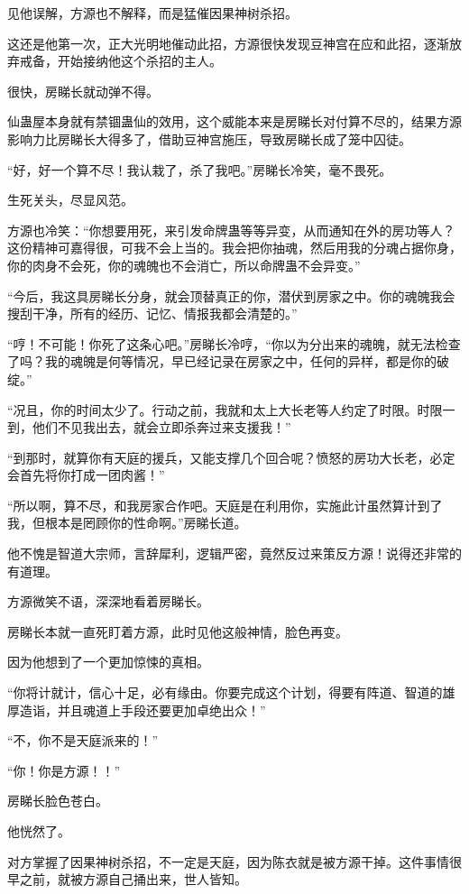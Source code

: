 \begin{this_body}
见他误解，方源也不解释，而是猛催因果神树杀招。

这还是他第一次，正大光明地催动此招，方源很快发现豆神宫在应和此招，逐渐放弃戒备，开始接纳他这个杀招的主人。

很快，房睇长就动弹不得。

仙蛊屋本身就有禁锢蛊仙的效用，这个威能本来是房睇长对付算不尽的，结果方源影响力比房睇长大得多了，借助豆神宫施压，导致房睇长成了笼中囚徒。

“好，好一个算不尽！我认栽了，杀了我吧。”房睇长冷笑，毫不畏死。

生死关头，尽显风范。

方源也冷笑：“你想要用死，来引发命牌蛊等等异变，从而通知在外的房功等人？这份精神可嘉得很，可我不会上当的。我会把你抽魂，然后用我的分魂占据你身，你的肉身不会死，你的魂魄也不会消亡，所以命牌蛊不会异变。”

“今后，我这具房睇长分身，就会顶替真正的你，潜伏到房家之中。你的魂魄我会搜刮干净，所有的经历、记忆、情报我都会清楚的。”

“哼！不可能！你死了这条心吧。”房睇长冷哼，“你以为分出来的魂魄，就无法检查了吗？我的魂魄是何等情况，早已经记录在房家之中，任何的异样，都是你的破绽。”

“况且，你的时间太少了。行动之前，我就和太上大长老等人约定了时限。时限一到，他们不见我出去，就会立即杀奔过来支援我！”

“到那时，就算你有天庭的援兵，又能支撑几个回合呢？愤怒的房功大长老，必定会首先将你打成一团肉酱！”

“所以啊，算不尽，和我房家合作吧。天庭是在利用你，实施此计虽然算计到了我，但根本是罔顾你的性命啊。”房睇长道。

他不愧是智道大宗师，言辞犀利，逻辑严密，竟然反过来策反方源！说得还非常的有道理。

方源微笑不语，深深地看着房睇长。

房睇长本就一直死盯着方源，此时见他这般神情，脸色再变。

因为他想到了一个更加惊悚的真相。

“你将计就计，信心十足，必有缘由。你要完成这个计划，得要有阵道、智道的雄厚造诣，并且魂道上手段还要更加卓绝出众！”

“不，你不是天庭派来的！”

“你！你是方源！！”

房睇长脸色苍白。

他恍然了。

对方掌握了因果神树杀招，不一定是天庭，因为陈衣就是被方源干掉。这件事情很早之前，就被方源自己捅出来，世人皆知。


\end{this_body}
